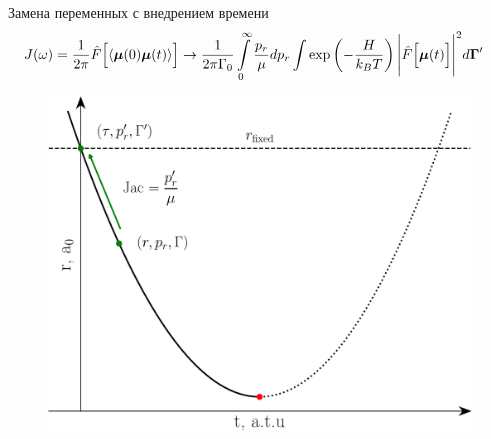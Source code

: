 \documentclass[10pt,usenames,pdf,hyperref={unicode},dvipsnames]{beamer}
\newcommand{\lb}{\left(}
\newcommand{\rb}{\right)}
\newcommand{\bmu}{\boldsymbol{\mu}}
\begin{document}
\begin{frame}{Замена переменных с внедрением времени}
    \vspace*{-1.2cm}
    \begin{gather}
        \hspace*{-0.3cm}
        J(\omega) = \frac{1}{2 \pi} \hat{F} \Big[ \langle \bmu(0) \bmu(t) \rangle \Big] \rightarrow \frac{1}{2 \pi \Gamma_0} \int\limits_0^\infty \frac{p_r}{\mu} dp_r \int \exp \lb -\frac{H}{k_B T} \rb \Bigg\vert \hat{F} \Big[ \bmu(t) \Big] \Bigg\vert^2 d\boldsymbol{\Gamma}^\prime \notag
    \end{gather}
    \vspace*{-0.8cm}
    \begin{figure}[H]
        \includegraphics[width=0.75\linewidth]{./pictures/time-change-crop.pdf}
    \end{figure}
\end{frame}
\end{document}
